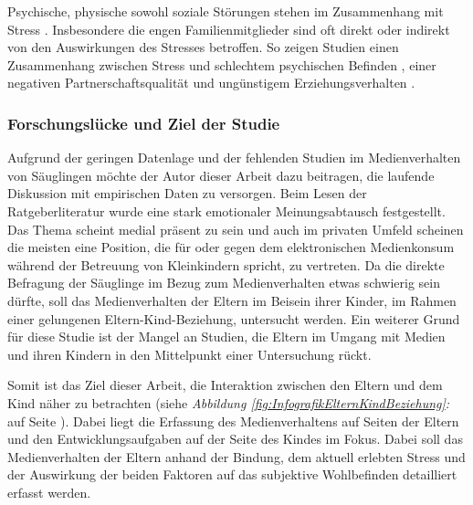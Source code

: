 Psychische, physische sowohl soziale Störungen stehen im Zusammenhang mit Stress \cite{Elfering2002, Burisch1994}. Insbesondere die engen Familienmitglieder sind oft direkt oder indirekt von den Auswirkungen des Stresses betroffen. So zeigen Studien einen Zusammenhang zwischen Stress und schlechtem psychischen Befinden \cite{Burisch1994, Krohne1997}, einer negativen Partnerschaftsqualität \cite{Bodenmann2000, Bodenmann1999, Bodenmann2000a} und ungünstigem Erziehungsverhalten \cite{Abidin1992, Belsky1984, WebsterStratton2000}.

\subsubsection{Forschungslücke und Ziel der Studie}
Aufgrund der geringen Datenlage und der fehlenden Studien im Medienverhalten von Säuglingen möchte der Autor dieser Arbeit dazu beitragen, die laufende Diskussion mit empirischen Daten zu versorgen. Beim Lesen der Ratgeberliteratur wurde eine stark emotionaler Meinungsabtausch festgestellt. Das Thema scheint medial präsent zu sein und auch im privaten Umfeld scheinen die meisten eine Position, die für oder gegen dem elektronischen Medienkonsum während der Betreuung von Kleinkindern spricht, zu vertreten. Da die direkte Befragung der Säuglinge im Bezug zum Medienverhalten etwas schwierig sein dürfte, soll das Medienverhalten der Eltern im Beisein ihrer Kinder, im Rahmen einer gelungenen Eltern-Kind-Beziehung, untersucht werden. Ein weiterer Grund für diese Studie ist der Mangel an Studien, die Eltern im Umgang mit Medien und ihren Kindern in den Mittelpunkt einer Untersuchung rückt.  

Somit ist das Ziel dieser Arbeit, die Interaktion  zwischen den Eltern und dem Kind näher zu betrachten (siehe \textit{Abbildung \ref{fig:InfografikElternKindBeziehung}: } auf Seite \pageref{fig:InfografikElternKindBeziehung}). Dabei liegt die Erfassung des Medienverhaltens auf Seiten der Eltern und den Entwicklungsaufgaben auf der Seite des Kindes im Fokus. Dabei soll das Medienverhalten der Eltern anhand der Bindung, dem aktuell erlebten Stress und der Auswirkung der beiden Faktoren auf das subjektive Wohlbefinden detailliert erfasst werden. 




